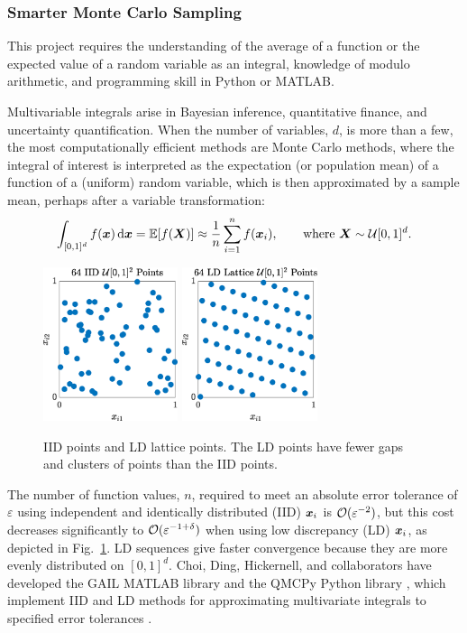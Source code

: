 \subsubsection{Smarter Monte Carlo Sampling}
This project requires the understanding of the average of a function or the expected value of a random variable as an integral, knowledge of modulo arithmetic, and programming skill in Python or MATLAB.

Multivariable integrals arise in Bayesian inference, quantitative finance, and uncertainty quantification.  When the number of variables, $d$, is more than a few, the most computationally efficient methods are Monte Carlo methods, where the integral of interest is interpreted as the expectation (or population mean) of a function of a (uniform) random variable, which is then approximated by a sample mean, perhaps after a variable transformation:
\[
    \int_{[0,1]^d} f({\boldsymbol{x}}) \, \textup{d} {\boldsymbol{x}} = \mathbb{E}[f({\boldsymbol{X}})] \approx \frac 1n \sum_{i=1}^n f({\boldsymbol{x}}_i), \qquad \text{where }{\boldsymbol{X}} \sim {\mathcal{U}}[0,1]^d.
\]

\begin{figure}
	\centering
	\includegraphics[height = 4.5cm]{IIDPoints.eps} \quad
	\includegraphics[height = 4.5cm]{ShiftedLatticePoints.eps}
	\caption{IID points and LD lattice points.  The LD points have fewer gaps and clusters of points than the IID points. \label{fig:iid_vs_ld}}
\end{figure}
The number of function values, $n$, required to meet an absolute error tolerance of $\varepsilon$ using independent and identically distributed (IID) ${\boldsymbol{x}}_i$ is $\mathcal{O}(\varepsilon^{-2})$, but this cost decreases significantly to $\mathcal{O}(\varepsilon^{-1+\delta})$ when using low discrepancy (LD) ${\boldsymbol{x}}_i$, as depicted in Fig.\ \ref{fig:iid_vs_ld}.  LD sequences give faster convergence because they are more evenly distributed on $[0,1]^d$.
Choi, Ding, Hickernell, and collaborators have developed the GAIL MATLAB library \cite{ChoEtal21a,TonEtAl22a} and the QMCPy Python library \cite{ChoEtal22a,QMCPy2020a}, which implement IID and LD methods for approximating multivariate integrals to specified error tolerances \cite{HicEtal14a,HicJim16a,JimHic16a,HicEtal17a,RatHic19a,JagHic22a}.  

